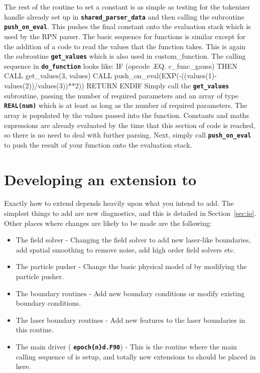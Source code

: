 \documentclass[12pt,a4paper]{article}
\newcommand{\inlinecode}[1]{{\color{warwickred} \bf\texttt{#1}}}
\newcommand{\EPOCH}{{\color{warwickdark}\fontfamily{phv}\selectfont{EPOCH}}}
\newenvironment{boxverbatim}{\lboxverbatim{none}}{\endlboxverbatim}
\begin{document}
The rest of the routine to set a constant is as simple as testing for the
tokenizer handle already set up in \inlinecode{shared\_parser\_data} and then
calling the subroutine \inlinecode{push\_on\_eval}. This pushes the final
constant onto the evaluation stack which is used by the RPN parser. The basic
sequence for functions is similar except for the addition of a code to read
the values that the function takes. This is again the subroutine
\inlinecode{get\_values} which is also used in custom\_function. The calling
sequence in \inlinecode{do\_function} looks like:
\begin{boxverbatim}
  IF (opcode .EQ. c_func_gauss) THEN
    CALL get_values(3, values)
    CALL push_on_eval(EXP(-((values(1)-values(2))/values(3))**2))
    RETURN
  ENDIF
\end{boxverbatim}
Simply call the \inlinecode{get\_values} subroutine, passing the number of
required parameters and an array of type \inlinecode{REAL(num)} which is at
least as long as the number of required parameters. The array is populated
by the values passed into the function. Constants and maths expressions are
already evaluated by the time that this section of code is reached, so there is
no need to deal with further parsing. Next, simply call
\inlinecode{push\_on\_eval} to push the result of your function onto the
evaluation stack.

\section{Developing an extension to {\EPOCH}}
\label{sec:extend}

Exactly how to extend {\EPOCH} depends heavily upon what you intend to add. The
simplest things to add are new diagnostics, and this is detailed in
Section~\ref{sec:io}. Other places where changes are likely to be made
are the following:
\begin{itemize}
\item The field solver - Changing the field solver to add new laser-like
  boundaries, add spatial smoothing to remove noise, add high order field
  solvers etc.
\item The particle pusher - Change the basic physical model of {\EPOCH} by
  modifying the particle pusher.
\item The boundary routines - Add new boundary conditions or modify existing
  boundary conditions.
\item The laser boundary routines - Add new features to the laser boundaries in
  this routine.
\item The main driver (\inlinecode{epoch\{n\}d.F90}) - This is the routine
  where the main calling sequence of {\EPOCH} is setup, and totally new
  extensions to {\EPOCH} should be placed in here.
\end{itemize}
\end{document}
